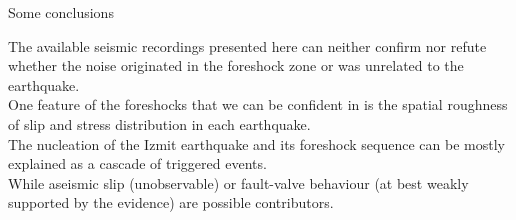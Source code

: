 \documentclass[aspectratio=43,9pt]{beamer}
\begin{document}
\begin{frame}{Some conclusions}

 The available seismic recordings presented here can 
 neither confirm nor refute whether the noise originated 
 in the foreshock zone or was unrelated to the earthquake.\\
 \vskip 0.5cm
 One feature of the foreshocks that we can be confident in is the
 spatial roughness of slip and stress distribution in each earthquake. \\
 \vskip 0.5cm
 The nucleation of the Izmit earthquake and its foreshock sequence
 can be mostly explained as a cascade of triggered events. \\
 \vskip 0.5cm
 While aseismic slip (unobservable) or fault-valve behaviour (at best
 weakly supported by the evidence) are possible contributors.
\end{frame}
\end{document}
